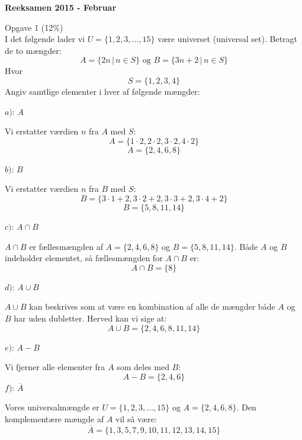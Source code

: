 \begin{center}
    \huge\bfseries Reeksamen 2015 - Februar \\
\end{center}

Opgave 1 (12\%) \\
I det følgende lader vi $U=\{1,2,3,\ldots,15\}$ være universet (universal set).
Betragt de to mængder:
\[ A=\{2n \,|\, n\in S\} \text{ og } B=\{3n+2 \,|\, n\in S\} \]
Hvor 
\[S=\{1,2,3,4\}\]
Angiv samtlige elementer i hver af følgende mængder:

$a)$: $A$

\hspace{15pt}   Vi erstatter værdien $n$ fra $A$ med $S$:
\[ A=\{1\cdot2,2\cdot2,3\cdot2,4\cdot2\} \]
\[ A=\{2,4,6,8\} \]

 $b)$: $B$
 
   \hspace{15pt} Vi erstatter værdien $n$ fra $B$ med $S$:
\[ B=\{3\cdot1+2,3\cdot2+2,3\cdot3+2,3\cdot4+2\} \]
\[ B=\{5,8,11,14\} \]

$c)$: $A\cap B$

    $A\cap B$  er fællesmængden af  $A=\{2,4,6,8\}$ og $B=\{5,8,11,14\}$. Både $A$ og $B$ indeholder elementet, så fællesmængden for  $A\cap B$ er:
    \[A\cap B=\{8\}\]

$d)$: $A\cup B$

\hspace{15pt}    $A\cup B$   kan beskrives som at være en kombination af alle  de mængder både $A$ og $B$ har uden dubletter. Herved kan vi sige at:
\[ A\cup B=\{2,4,6,8,11,14\} \]

$e)$: $A-B$ 
    
    Vi fjerner alle elementer fra  $A$ som deles med $B$: 
\[ A-B=\{2,4,6\} \]
$f)$:  $\overline{A}$ 

    Vores universalmængde er $U=\{1,2,3,\ldots,15\}$ og $A=\{2,4,6,8\}$.
    Den komplementære mængde af $A$ vil så være:
\[ \overline{A}=\{1,3,5,7,9,10,11,12,13,14,15\} \]